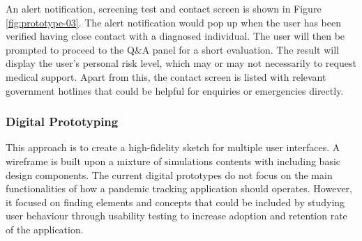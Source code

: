       \par An alert notification, screening test and contact screen is shown in Figure \ref{fig:prototype-03}. The alert notification would pop up when the user has been verified having close contact with a diagnosed individual. The user will then be prompted to proceed to the Q\&A panel for a short evaluation. The result will display the user's personal risk level, which may or may not necessarily to request medical support. Apart from this, the contact screen is listed with relevant government hotlines that could be helpful for enquiries or emergencies directly.

    \subsubsection{Digital Prototyping}
      \par This approach is to create a high-fidelity sketch for multiple user interfaces. A wireframe is built upon
      a mixture of simulations contents with including basic design components. The current digital
      prototypes do not focus on the main functionalities of how a pandemic tracking application should
      operates. However, it focused on finding elements and concepts that could be included by studying
      user behaviour through usability testing to increase adoption and retention rate of the application.

